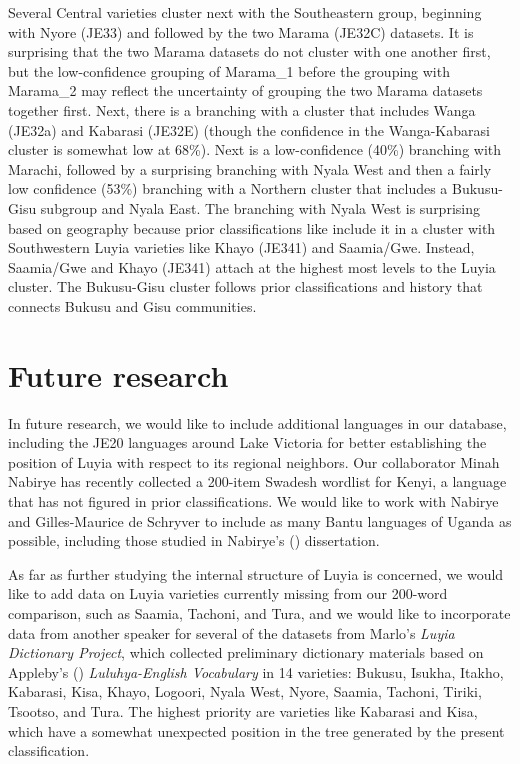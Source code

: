 \documentclass[output=paper]{langscibook}
\begin{document}
Several Central varieties cluster next  with the Southeastern group, beginning with Nyore (JE33) and followed by the two Marama (JE32C) datasets. It is surprising that the two Marama datasets do not cluster with one another first, but the low-confidence grouping of Marama\_1 before the grouping with Marama\_2 may reflect the uncertainty of grouping the two Marama datasets together first. Next, there is a branching with a cluster that includes Wanga (JE32a) and Kabarasi (JE32E) (though the confidence in the Wanga-Kabarasi cluster is somewhat low at 68\%). Next is a low-confidence (40\%) branching with Marachi, followed by a surprising branching with Nyala West and then a fairly low confidence (53\%) branching with a Northern cluster that includes a Bukusu-Gisu subgroup and Nyala East. The branching with Nyala West is surprising based on geography because prior classifications like \citet{williams_lexico-statistical_1973} include it in a cluster with Southwestern Luyia varieties like Khayo (JE341) and Saamia\slash{}Gwe. Instead, Saamia\slash{}Gwe and Khayo (JE341) attach at the highest most levels to the Luyia cluster. The Bukusu-Gisu cluster follows prior classifications and history that connects Bukusu and Gisu communities.

\section{Future research}
\label{sec:5:Future_research}

In future research, we would like to include additional languages in our database, including the JE20 languages around Lake Victoria for better establishing the position of Luyia with respect to its regional neighbors. Our collaborator Minah Nabirye has recently collected a 200-item Swadesh wordlist for Kenyi, a language that has not figured in prior classifications. We would like to work with Nabirye and Gilles-Maurice de Schryver to include as many Bantu languages of Uganda as possible, including those studied in Nabirye’s (\citeyear{nabirye_corpus-based_2016}) dissertation.

As far as further studying the internal structure of Luyia is concerned, we would like to add data on Luyia varieties currently missing from our 200-word comparison, such as Saamia, Tachoni, and Tura, and we would like to incorporate data from another speaker for several of the datasets from Marlo's \textit{Luyia Dictionary Project}, which collected preliminary dictionary materials based on Appleby's (\citeyear{appleby_luluhya-english_1943}) \textit{Luluhya-English Vocabulary} in 14 varieties: Bukusu, Isukha, Itakho, Kabarasi, Kisa, Khayo, Logoori, Nyala West, Nyore, Saamia, Tachoni, Tiriki, Tsootso, and Tura. The highest priority are varieties like Kabarasi and Kisa, which have a somewhat unexpected position in the tree generated by the present classification.
\end{document}
